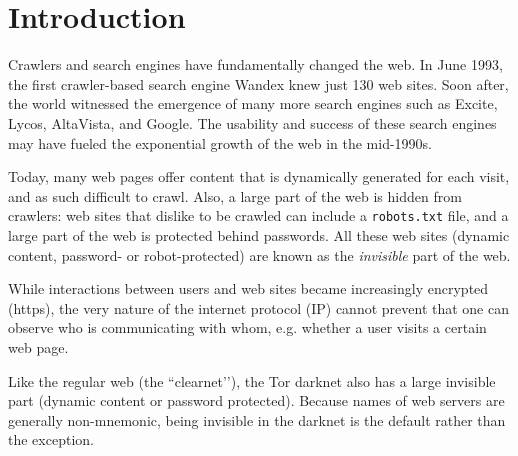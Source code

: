\documentclass[USenglish,oneside,twocolumn]{article}
\begin{document}
 

\maketitle


\section{Introduction}

 
Crawlers and search engines have fundamentally changed the web. In June 1993, the first crawler-based search engine Wandex knew just 130 web sites. Soon after, the world witnessed the emergence of many more search engines such as 
Excite, Lycos, AltaVista, and Google. The usability and success of these search engines may have fueled the exponential growth of the web in the mid-1990s.


Today, many web pages offer content that is dynamically generated for each visit, and as such difficult to crawl. Also, a large part of the web is hidden from crawlers: web sites that dislike to be crawled can include a \texttt{robots.txt} file, and a large part of the web is protected behind passwords. All these web sites (dynamic content, password- or robot-protected) are known as the \emph{invisible} part of the web.


While interactions between users and web sites became increasingly encrypted (https), the very nature of the internet protocol (IP) cannot prevent that one can observe who is communicating with whom, e.g. whether a user visits a certain web page.





Like the regular web (the ``clearnet’’), the Tor darknet also has a large invisible part (dynamic content or password protected). Because names of web servers are generally non-mnemonic, being invisible in the darknet is the default rather than the exception.
\end{document}
